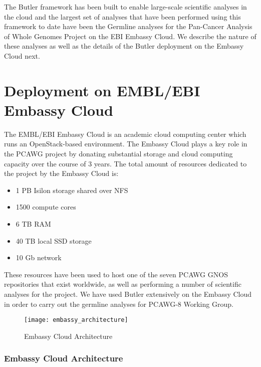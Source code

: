The Butler framework has been built to enable large-scale scientific analyses in the cloud and the largest set of analyses that have been performed using this framework to date have been the Germline analyses for the Pan-Cancer Analysis of Whole Genomes Project on the EBI Embassy Cloud. We describe the nature of these analyses as well as the details of the Butler deployment on the Embassy Cloud next.

\section{Deployment on EMBL/EBI Embassy Cloud}

The EMBL/EBI Embassy Cloud\autocite{cook2016european} is an academic cloud computing center which runs an OpenStack-based environment. The Embassy Cloud plays a key role in the PCAWG project by donating substantial storage and cloud computing capacity over the course of 3 years. The total amount of resources dedicated to the project by the Embassy Cloud is:

\begin{itemize}
\item 1 PB Isilon storage shared over NFS
\item 1500 compute cores
\item 6 TB RAM
\item 40 TB local SSD storage
\item 10 Gb network
\end{itemize}

These resources have been used to host one of the seven PCAWG GNOS repositories that exist worldwide, as well as performing a number of scientific analyses for the project. We have used Butler extensively on the Embassy Cloud in order to carry out the germline analyses for PCAWG-8 Working Group.

\begin{figure}[H]
\texttt{[image: embassy\_architecture]}
\centering
\caption {Embassy Cloud Architecture}
\label{fig:embassy_architecture}
\end{figure}

\subsubsection{Embassy Cloud Architecture}

